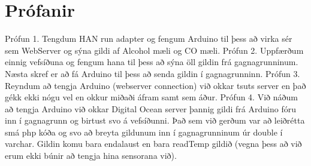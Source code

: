 \section{Prófanir}
Prófun 1. Tengdum HAN run adapter og fengum Arduino til þess að virka sér sem WebServer og sýna gildi af Alcohol mæli og CO mæli. 
Prófun 2. Uppfærðum einnig vefsíðuna og fengum hana til þess að sýna öll gildin frá gagnagrunninum. Næsta skref er að fá Arduino til þess að senda gildin í gagnagrunninn.
Prófun 3. Reyndum að tengja Arduino (webserver connection) við okkar tsuts server en það gékk ekki nógu vel en okkur miðaði áfram samt sem áður. 
Prófun 4. Við náðum að tengja Arduino við okkar Digital Ocean server þannig gildi frá Arduino fóru inn í gagnagrunn og birtust svo á vefsíðunni. Það sem við gerðum var að leiðrétta smá php kóða og svo að breyta gildunum inn í gagnagrunninum úr double í varchar. Gildin komu bara endalaust en bara readTemp gildið (vegna þess að við erum ekki búnir að tengja hina sensorana við). 
   


